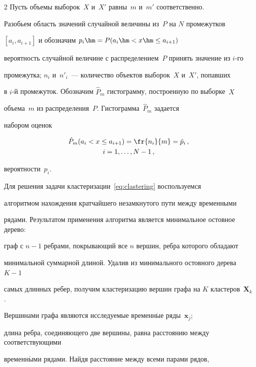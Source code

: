 \begin{multicols}{2}
 Пусть объемы выборок~$X$ и~$X'$ равны~$m$ и~$m'$ соответственно.

 Разобьем область значений случайной величины из~$P$ на $N$ промежутков

 $[a_{i}, a_{i+1}]$  и обозначим $p_i \hm= P(a_{i} \hm< x \hm\leq a_{i+1})$

 вероятность случайной величине с распределением~$P$ принять значение из $i$-го

 промежутка; $n_i$ и~$n'_i$~--- количество объектов выборок~$X$ и~$X'$, попавших

 в $i$-й промежуток. Обозначим $\hat{P}_{m}$ гистограмму, построенную по выборке~$X$

 объема~$m$ из распределения~$P$. Гистограмма~$\hat{P}_{m}$ задается

 набором оценок



 \noindent

\begin{multline}

\hat{P}_m(a_{i} < x \leq a_{i+1}) = \fr{n_{i}}{m} = \hat{p}_i\,,\\

i = 1,\dots,N-1\,,

\label{eq:hist}

\end{multline}

 вероятности~$p_i$.



 Для решения задачи кластеризации~\eqref{eq:clastering} вос\-пользуемся

 алгоритмом нахождения кратчайшего незамкнутого пути между временными

 рядами. Результатом применения алгоритма является минимальное остовное дерево:

 граф  с $n-1$ ребрами, покрывающий все $n$ вершин, ребра которого обладают

 минимальной суммарной длиной. Удалив из минимального остовного дерева $K-1$

 самых длинных ребер, получим кластеризацию вершин графа на $K$ кластеров~$\mathbf{X}_k$.

 Вершинами графа являются исследуемые временн$\acute{\mbox{ы}}$е ряды~$\mathbf{x}_j$;

 длина ребра, соединяющего две вершины, равна расстоянию между соответствующими

 временн$\acute{\mbox{ы}}$ми рядами. Найдя расстояние между всеми парами рядов,


\end{multicols}
